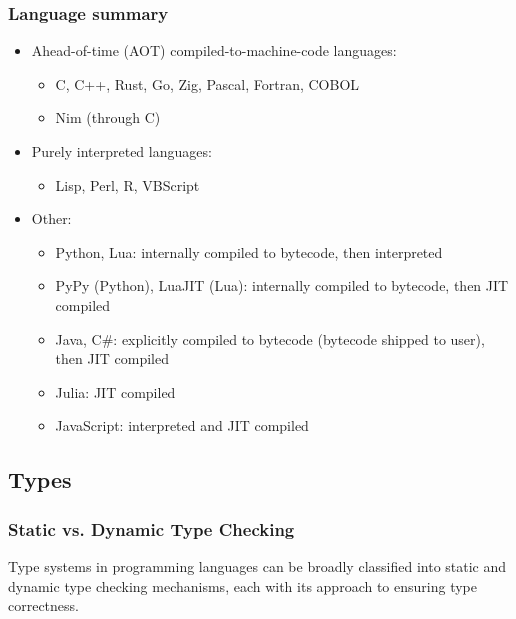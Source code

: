 \documentclass[12pt]{article}
\begin{document}
\subsubsection{Language summary}

\begin{itemize}
    \item Ahead-of-time (AOT) compiled-to-machine-code languages:
    \begin{itemize}
        \item C, C++, Rust, Go, Zig, Pascal, Fortran, COBOL
        \item Nim (through C)
    \end{itemize}
    \item Purely interpreted languages:
    \begin{itemize}
        \item Lisp, Perl, R, VBScript
    \end{itemize}
    \item Other:
    \begin{itemize}
        \item Python, Lua: internally compiled to bytecode, then interpreted
        \item PyPy (Python), LuaJIT (Lua): internally compiled to bytecode, then JIT compiled
        \item Java, C\#: explicitly compiled to bytecode (bytecode shipped to user), then JIT compiled
        \item Julia: JIT compiled
        \item JavaScript: interpreted and JIT compiled
    \end{itemize}
\end{itemize}

\subsection{Types}

\subsubsection{Static vs. Dynamic Type Checking}

Type systems in programming languages can be broadly classified into static and dynamic type checking mechanisms, each with its approach to ensuring type correctness.
\end{document}
